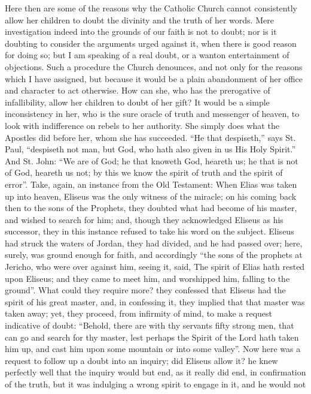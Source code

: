 Here then are some of the reasons why the Catholic Church cannot
consistently allow her children to doubt the divinity and the truth of
her words. Mere investigation indeed into the grounds of our faith is
not to doubt; nor is it doubting to consider the arguments urged
against it, when there is good reason for doing so; but I am speaking
of a real doubt, or a wanton entertainment of objections. Such a
procedure the Church denounces, and not only for the reasons which I
have assigned, but because it would be a plain abandonment of her
office and character to act otherwise. How can she, who has the
prerogative of infallibility, allow her children to doubt of her gift?
It would be a simple inconsistency in her, who is the sure oracle of
truth and messenger of heaven, to look with indifference on rebels to
her authority. She simply does what the Apostles did before her, whom
she has succeeded. ``He that despiseth,'' says St. Paul,
``despiseth not man, but God, who hath also given in us His Holy
Spirit.'' And St. John: ``We are of God; he that knoweth God,
heareth us; he that is not of God, heareth us not; by this we know the
spirit of truth and the spirit of error''. Take, again, an
instance from the Old Testament: When Elias was taken up into heaven,
Eliseus was the only witness of the miracle; on his coming back then
to the sons of the Prophets, they doubted what had become of his
master, and wished to search for him; and, though they acknowledged
Eliseus as his successor, they in this instance refused to take his
word on the subject. Eliseus had struck the waters of Jordan, they had
divided, and he had passed over; here, surely, was ground enough for
faith, and accordingly ``the sons of the prophets at Jericho, who
were over against him, seeing it, said, The spirit of Elias hath
rested upon Eliseus; and they came to meet him, and worshipped him,
falling to the ground''. What could they require more? they
confessed that Eliseus had the spirit of his great master, and, in
confessing it, they implied that that master was taken away; yet, they
proceed, from infirmity of mind, to make a request indicative of
doubt: ``Behold, there are with thy servants fifty strong men,
that can go and search for thy master, lest perhaps the Spirit of the
Lord hath taken him up, and cast him upon some mountain or into some
valley''. Now here was a request to follow up a doubt into an
inquiry; did Eliseus allow it? he knew perfectly well that the inquiry
would but end, as it really did end, in confirmation of the truth, but
it was indulging a wrong spirit to engage in it, and he would not
